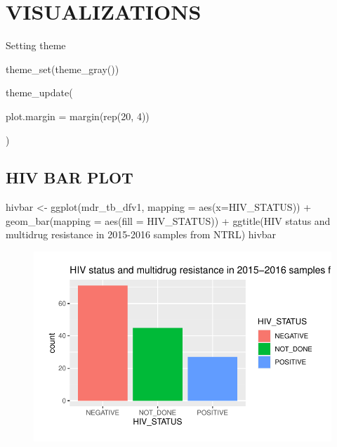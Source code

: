 \documentclass[
]{report}
\newenvironment{Shaded}{\begin{snugshade}}{\end{snugshade}}
\newcommand{\AttributeTok}[1]{\textcolor[rgb]{0.40,0.45,0.13}{#1}}
\newcommand{\DecValTok}[1]{\textcolor[rgb]{0.68,0.00,0.00}{#1}}
\newcommand{\FunctionTok}[1]{\textcolor[rgb]{0.28,0.35,0.67}{#1}}
\newcommand{\NormalTok}[1]{\textcolor[rgb]{0.00,0.23,0.31}{#1}}
\newcommand{\OtherTok}[1]{\textcolor[rgb]{0.00,0.23,0.31}{#1}}
\newcommand{\SpecialCharTok}[1]{\textcolor[rgb]{0.37,0.37,0.37}{#1}}
\newcommand{\StringTok}[1]{\textcolor[rgb]{0.13,0.47,0.30}{#1}}
\begin{document}
\hypertarget{visualizations}{%
\chapter{VISUALIZATIONS}\label{visualizations}}

Setting theme

\begin{Shaded}
\begin{Highlighting}[]
\FunctionTok{theme\_set}\NormalTok{(}\FunctionTok{theme\_gray}\NormalTok{())}

\FunctionTok{theme\_update}\NormalTok{(}

  \AttributeTok{plot.margin =} \FunctionTok{margin}\NormalTok{(}\FunctionTok{rep}\NormalTok{(}\DecValTok{20}\NormalTok{, }\DecValTok{4}\NormalTok{))}

\NormalTok{)}
\end{Highlighting}
\end{Shaded}

\hypertarget{hiv-bar-plot}{%
\section{HIV BAR PLOT}\label{hiv-bar-plot}}

\begin{Shaded}
\begin{Highlighting}[]
\NormalTok{hivbar }\OtherTok{\textless{}{-}} \FunctionTok{ggplot}\NormalTok{(mdr\_tb\_dfv1, }\AttributeTok{mapping =} \FunctionTok{aes}\NormalTok{(}\AttributeTok{x=}\NormalTok{HIV\_STATUS)) }\SpecialCharTok{+} \FunctionTok{geom\_bar}\NormalTok{(}\AttributeTok{mapping =} \FunctionTok{aes}\NormalTok{(}\AttributeTok{fill =}\NormalTok{ HIV\_STATUS)) }\SpecialCharTok{+} \FunctionTok{ggtitle}\NormalTok{(}\StringTok{\textquotesingle{}HIV status and multidrug resistance in 2015{-}2016 samples from NTRL\textquotesingle{}}\NormalTok{)}
\NormalTok{hivbar}
\end{Highlighting}
\end{Shaded}

\begin{figure}[H]

{\centering \includegraphics{MDR_TB_files/figure-pdf/unnamed-chunk-9-1.pdf}

}

\end{figure}
\end{document}
